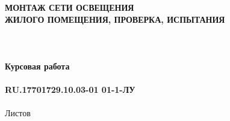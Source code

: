 \documentclass{article}
\begin{document}
\fontsize{14}{16}\selectfont
\thispagestyle{empty}
\clearpage
{}
\bigskip
\begin{center}
\topskip=0pt
\vspace*{\fill}
\textbf{МОНТАЖ СЕТИ ОСВЕЩЕНИЯ\\
ЖИЛОГО ПОМЕЩЕНИЯ, ПРОВЕРКА, ИСПЫТАНИЯ\\
~\\
~\\
~\\
Курсовая работа\\
~\\
RU.17701729.10.03-01 01-1-ЛУ}\\
~\\
Листов \ztotpages\\
\vspace*{\fill}
\end{center}
\begin{center}
\end{center}
\newpage
\tableofcontents
\newpage
\newpage
\end{document}

